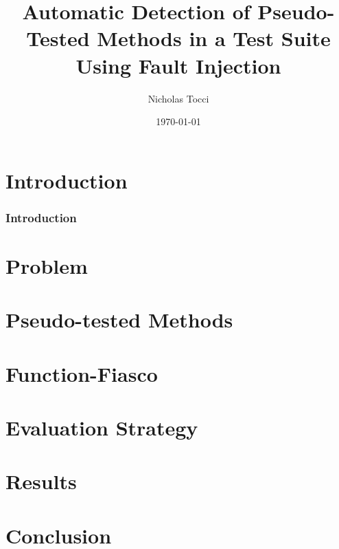 \documentclass{beamer}
\title{Automatic Detection of Pseudo-Tested Methods in a Test Suite Using Fault Injection}
\author{Nicholas Tocci}
\date{\today}
\begin{document}
\section{Introduction}
\begin{frame}
	\frametitle{Introduction}
	\titlepage
\end{frame}
\section{Problem}
\label{sec:problem}


\section{Pseudo-tested Methods}
\label{sec:pseudo-tested methods}


\section{Function-Fiasco}
\label{sec:function-fiasco}


\section{Evaluation Strategy}
\label{sec:Evaluation Strategy}


\section{Results}
\label{sec:Results}


\section{Conclusion}
\label{sec:Conclusion}

\end{document}
